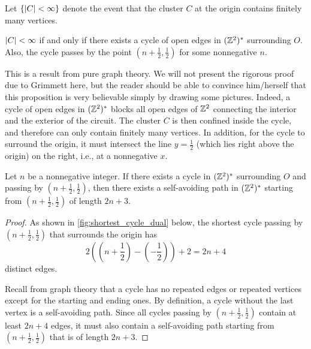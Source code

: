\documentclass[a4paper, 12pt]{article}
\begin{document}
Let $\{\lvert C \rvert < \infty\}$ denote the event that the cluster $C$ at the origin contains finitely many vertices.

\begin{prop}\label{prop:c_finite_iff_cycle}
$\lvert C \rvert < \infty$ if and only if there exists a cycle of open edges in $(\mathbb{Z}^2)^*$ surrounding $O$. Also, the cycle passes by the point $(n + \frac{1}{2}, \frac{1}{2})$ for some nonnegative $n$.
\end{prop}

This is a result from pure graph theory. We will not present the rigorous proof due to Grimmett \autocite*[14--15]{grimmett_1999} here, but the reader should be able to convince him/herself that this proposition is very believable simply by drawing some pictures. Indeed, a cycle of open edges in $(\mathbb{Z}^2)^*$ blocks all open edges of $\mathbb{Z}^2$ connecting the interior and the exterior of the circuit. The cluster $C$ is then confined inside the cycle, and therefore can only contain finitely many vertices. In addition, for the cycle to surround the origin, it must intersect the line $y = \frac{1}{2}$ (which lies right above the origin) on the right, i.e., at a nonnegative $x$.

\begin{prop}\label{prop:cylce_implies_path}
Let $n$ be a nonnegative integer. If there exists a cycle in $(\mathbb{Z}^2)^*$ surrounding $O$ and passing by $(n + \frac{1}{2}, \frac{1}{2})$, then there exists a self-avoiding path in $(\mathbb{Z}^2)^*$ starting from $(n + \frac{1}{2}, \frac{1}{2})$ of length $2n + 3$.
\end{prop}
\begin{proof}
As shown in \cref{fig:shortest_cycle_dual} below, the shortest cycle passing by $(n + \frac{1}{2}, \frac{1}{2})$ that surrounds the origin has \[2\left((n + \frac{1}{2}) - (-\frac{1}{2})\right) + 2 = 2n + 4\] distinct edges.


Recall from graph theory that a cycle has no repeated edges or repeated vertices except for the starting and ending ones. By definition, a cycle without the last vertex is a self-avoiding path. Since all cycles passing by $(n + \frac{1}{2}, \frac{1}{2})$ contain at least $2n + 4$ edges, it must also contain a self-avoiding path starting from $(n + \frac{1}{2}, \frac{1}{2})$ that is of length $2n + 3$.
\end{proof}
\end{document}
